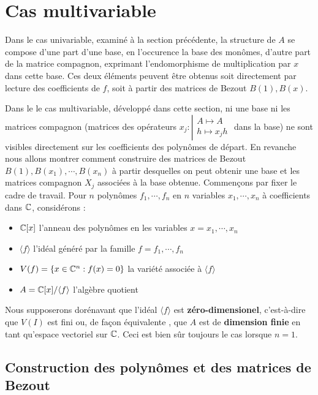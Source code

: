 \documentclass{standalone}
\begin{document}
\section{Cas multivariable}
\label{multivariable}

Dans le cas univariable, examiné à la section précédente, la structure de $A$ se compose d'une part d'une base, en l'occurence la base des monômes, d'autre part de la matrice compagnon, exprimant l'endomorphisme de multiplication par $x$ dans cette base. Ces deux éléments peuvent être obtenus soit directement par lecture des coefficients de $f$, soit à partir des matrices de Bezout $B(1), B(x)$.

Dans le le cas multivariable, développé dans cette section, ni une base ni les matrices compagnon (matrices des opérateurs
$x_j : \left\vert
\begin{array}{c}
A \mapsto A \\
h \mapsto x_jh
\end{array}
\right.$ dans la base) ne sont visibles directement sur les coefficients des polynômes de départ. En revanche nous allons montrer comment construire des matrices de Bezout $B(1), B(x_1), \cdots, B(x_n)$ à partir desquelles on peut obtenir une base et les matrices compagnon $X_j$ associées à la base obtenue. Commençons par fixer le cadre de travail.
Pour $n$ polynômes $f_1,\cdots, f_n$ en $n$ variables $x_1,\cdots, x_n$ à coefficients dans $\mathbb{C}$, considérons :
\begin{itemize}
\item $\mathbb{C}[x]$ l'anneau des polynômes en les variables $x = x_1,\cdots, x_n$
\item $\langle f \rangle$ l'idéal généré par la famille  $f = f_1,\cdots, f_n$
\item $V(f) = \{x \in \mathbb{C}^n : f(x) = 0\}$ la variété associée à $\langle f\rangle$
\item $A = \mathbb{C}[x]/\langle f\rangle$ l'algèbre quotient
\end{itemize}
Nous supposerons dorénavant que l'idéal $\langle f\rangle$ est {\bf zéro-dimensionel}, c'est-à-dire que $V(I)$ est fini ou, de façon équivalente \cite[p.~234]{clo}, que $A$ est de {\bf dimension finie} en tant qu'espace vectoriel sur $\mathbb{C}$. Ceci est bien sûr toujours le cas lorsque $n = 1$.

\subsection{Construction des polynômes et des matrices de Bezout}
\end{document}

